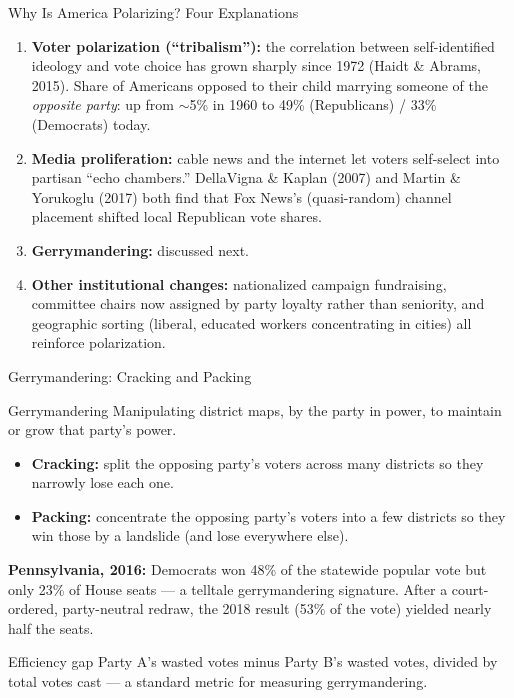 \documentclass[11pt,aspectratio=169]{beamer}
\begin{document}
\begin{frame}{Why Is America Polarizing? Four Explanations}
  \small
  \begin{enumerate}
    \setlength{\itemsep}{3pt}
    \item \textbf{Voter polarization (``tribalism''):} the correlation between self-identified ideology and vote choice has grown sharply since 1972 (Haidt \& Abrams, 2015). Share of Americans opposed to their child marrying someone of the \emph{opposite party}: up from $\sim$5\% in 1960 to 49\% (Republicans) / 33\% (Democrats) today.
    \item \textbf{Media proliferation:} cable news and the internet let voters self-select into partisan ``echo chambers.'' DellaVigna \& Kaplan (2007) and Martin \& Yorukoglu (2017) both find that Fox News's (quasi-random) channel placement shifted local Republican vote shares.
    \item \textbf{Gerrymandering:} discussed next.
    \item \textbf{Other institutional changes:} nationalized campaign fundraising, committee chairs now assigned by party loyalty rather than seniority, and geographic sorting (liberal, educated workers concentrating in cities) all reinforce polarization.
  \end{enumerate}
\end{frame}

\begin{frame}{Gerrymandering: Cracking and Packing}
  \begin{block}{Gerrymandering}
    Manipulating district maps, by the party in power, to maintain or grow that party's power.
  \end{block}
  \begin{itemize}
    \item \textbf{Cracking:} split the opposing party's voters across many districts so they narrowly lose each one.
    \item \textbf{Packing:} concentrate the opposing party's voters into a few districts so they win those by a landslide (and lose everywhere else).
  \end{itemize}
  \small \textbf{Pennsylvania, 2016:} Democrats won 48\% of the statewide popular vote but only 23\% of House seats --- a telltale gerrymandering signature. After a court-ordered, party-neutral redraw, the 2018 result (53\% of the vote) yielded nearly half the seats.
  \vspace{0.3em}
  \begin{block}{Efficiency gap}
    Party A's wasted votes minus Party B's wasted votes, divided by total votes cast --- a standard metric for measuring gerrymandering.
  \end{block}
\end{frame}
\end{document}
